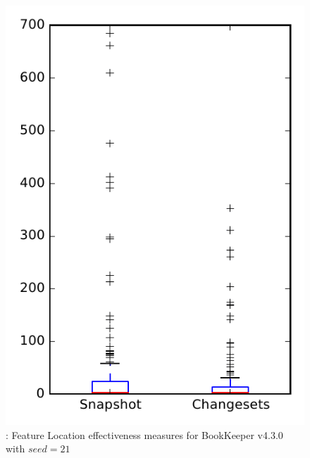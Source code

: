 
\begin{figure}
\centering
\includegraphics[height=0.4\textheight]{figures/flt_seed/rq1_bookkeeper_21}
\caption{\rone: Feature Location effectiveness measures for BookKeeper v4.3.0 with $seed=21$}
\label{fig:flt_seed:rq1:bookkeeper}
\end{figure}
